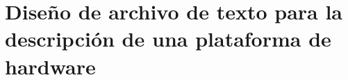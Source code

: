 \section{Diseño de archivo de texto para la descripción de una plataforma de hardware}
\label{sec:modelFileDesign}


